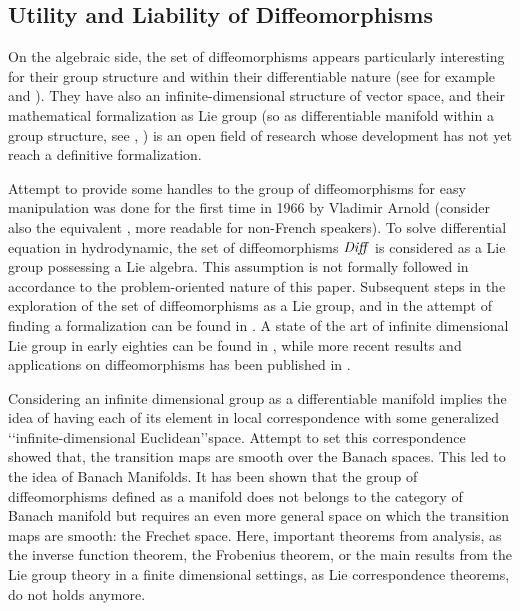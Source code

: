 \subsection{Utility and Liability of Diffeomorphisms}\label{se:diffe_util_and_liab}

On the algebraic side, the set of diffeomorphisms appears particularly interesting for their group structure and within their differentiable nature (see for example \cite{michor1980manifolds} and \cite{lempert1997problem}). They have also an infinite-dimensional structure of vector space, and their mathematical formalization as Lie group (so as differentiable manifold within a group structure, see \cite{warner}, \cite{lee2012introduction}) is an open field of research whose development has not yet reach a definitive formalization.

Attempt to provide some handles to the group of diffeomorphisms for easy manipulation was done for the first time in 1966 by Vladimir Arnold \cite{arnold1966geometrie} (consider also the equivalent \cite{arnold1998topological}, more readable for non-French speakers). To solve differential equation in hydrodynamic, the set of diffeomorphisms $\text{\emph{Diff}}$ is considered as a Lie group possessing a Lie algebra. This assumption is not formally followed in accordance to the problem-oriented nature of this paper. Subsequent steps in the exploration of the set of diffeomorphisms as a Lie group, and in the attempt of finding a formalization can be found in \cite{marsden1970hamiltonian, ebin1970groups, omori1970group, michor1980manifolds, leslie1983lie}. A state of the art of  infinite dimensional Lie group in early eighties can be found in \cite{Milnor:84:remarks}, while more recent results and applications on diffeomorphisms has been published in \cite{ovsienko1992integrals, bauer2010sobolev, schmid2010infinite,  bauer2011geodesic}.

Considering an infinite dimensional group as a differentiable manifold implies the idea of having each of its element in local correspondence with some generalized \lq\lq infinite-dimensional Euclidean\rq\rq\phantom{z}space. Attempt to set this correspondence showed that, the transition maps are smooth over the Banach spaces. This led to the idea of Banach Manifolds. It has been shown \cite{khesin2008geometry} that the group of diffeomorphisms defined as a manifold does not belongs to the category of Banach manifold but requires an even more general space on which the transition maps are smooth: the Frechet space. Here, important theorems from analysis, as the inverse function theorem, the Frobenius theorem, or the main results from the Lie group theory in a finite dimensional settings, as Lie correspondence theorems, do not holds anymore. 


